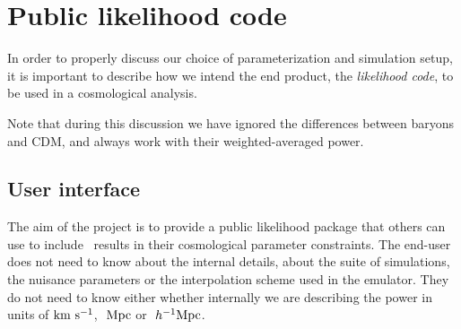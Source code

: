 \section{Public likelihood code} \label{sec:like}

In order to properly discuss our choice of parameterization and simulation
setup, it is important to describe how we intend the end product,
the \textit{likelihood code}, to be used in a cosmological analysis.

Note that during this discussion we have ignored the differences between 
baryons and CDM, and always work with their weighted-averaged power. 


\subsection{User interface}


The aim of the project is to provide a public likelihood package that others
can use to include \lya\ results in their cosmological parameter constraints.
The end-user does not need to know about the internal details, about the 
suite of simulations, the nuisance parameters or the interpolation scheme 
used in the emulator.
They do not need to know either whether internally we are describing the 
power in units of ${\rm km~s^{-1}}$, $\ \text{Mpc}$ or $\ h^{-1}\text{Mpc}$. 

